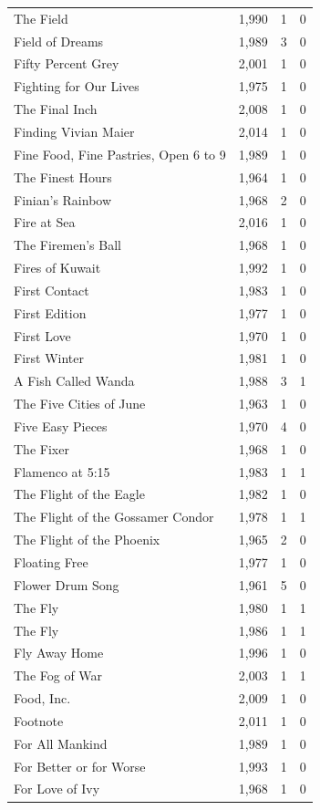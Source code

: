 \begin{tabular}{lrrr}
The Field & 1,990 & 1 & 0 \\
Field of Dreams & 1,989 & 3 & 0 \\
Fifty Percent Grey & 2,001 & 1 & 0 \\
Fighting for Our Lives & 1,975 & 1 & 0 \\
The Final Inch & 2,008 & 1 & 0 \\
Finding Vivian Maier & 2,014 & 1 & 0 \\
Fine Food, Fine Pastries, Open 6 to 9 & 1,989 & 1 & 0 \\
The Finest Hours & 1,964 & 1 & 0 \\
Finian's Rainbow & 1,968 & 2 & 0 \\
Fire at Sea & 2,016 & 1 & 0 \\
The Firemen's Ball & 1,968 & 1 & 0 \\
Fires of Kuwait & 1,992 & 1 & 0 \\
First Contact & 1,983 & 1 & 0 \\
First Edition & 1,977 & 1 & 0 \\
First Love & 1,970 & 1 & 0 \\
First Winter & 1,981 & 1 & 0 \\
A Fish Called Wanda & 1,988 & 3 & 1 \\
The Five Cities of June & 1,963 & 1 & 0 \\
Five Easy Pieces & 1,970 & 4 & 0 \\
The Fixer & 1,968 & 1 & 0 \\
Flamenco at 5:15 & 1,983 & 1 & 1 \\
The Flight of the Eagle & 1,982 & 1 & 0 \\
The Flight of the Gossamer Condor & 1,978 & 1 & 1 \\
The Flight of the Phoenix & 1,965 & 2 & 0 \\
Floating Free & 1,977 & 1 & 0 \\
Flower Drum Song & 1,961 & 5 & 0 \\
The Fly & 1,980 & 1 & 1 \\
The Fly & 1,986 & 1 & 1 \\
Fly Away Home & 1,996 & 1 & 0 \\
The Fog of War & 2,003 & 1 & 1 \\
Food, Inc. & 2,009 & 1 & 0 \\
Footnote & 2,011 & 1 & 0 \\
For All Mankind & 1,989 & 1 & 0 \\
For Better or for Worse & 1,993 & 1 & 0 \\
For Love of Ivy & 1,968 & 1 & 0 \\

\end{tabular}
